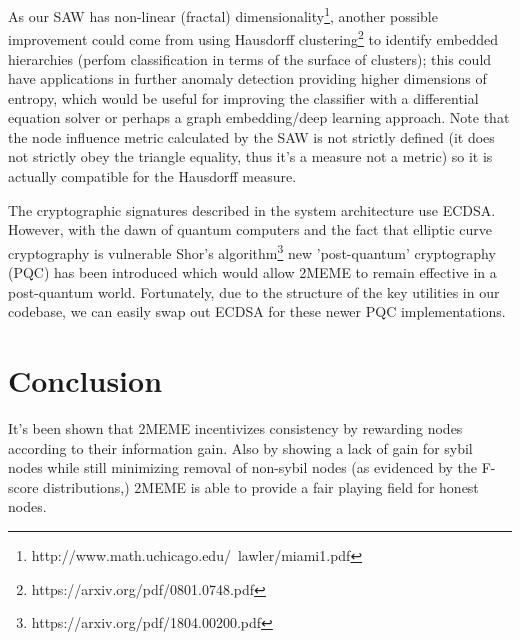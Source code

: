 \documentclass{article}
\begin{document}
	As our SAW has non-linear (fractal) dimensionality\footnote{http://www.math.uchicago.edu/~lawler/miami1.pdf}, another possible improvement could come from using Hausdorff clustering\footnote{https://arxiv.org/pdf/0801.0748.pdf} to identify embedded hierarchies (perfom classification in terms of the surface of clusters); this could have applications in further anomaly detection providing higher dimensions of entropy, which would be useful for improving the classifier with a differential equation solver or perhaps a graph embedding/deep learning approach. Note that the node influence metric calculated by the SAW is not strictly defined (it does not strictly obey the triangle equality, thus it's a measure not a metric) so it is actually compatible for the Hausdorff measure. 
	
	The cryptographic signatures described in the system architecture use ECDSA. However, with the dawn of quantum computers and the fact that elliptic curve cryptography is vulnerable Shor's algorithm\footnote{https://arxiv.org/pdf/1804.00200.pdf} new 'post-quantum' cryptography (PQC) has been introduced which would allow 2MEME to remain effective in a post-quantum world. Fortunately, due to the structure of the key utilities in our codebase, we can easily swap out ECDSA for these newer PQC implementations. 

	
\section{Conclusion}
It's been shown that 2MEME incentivizes consistency by rewarding nodes according to their information gain. Also by showing a lack of gain for sybil nodes while still minimizing removal of non-sybil nodes (as evidenced by the F-score distributions,) 2MEME is able to provide a fair playing field for honest nodes.
	
	
\end{document}
